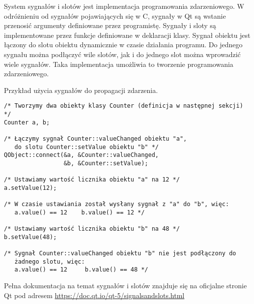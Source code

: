 
\par
System sygnałów i slotów jest implementacja programowania zdarzeniowego.
W odróżnieniu od sygnałów pojawiających się w C, sygnały w Qt są wstanie przenosić argumenty definiowane przez programistę.
Sygnały i sloty są implementowane przez funkcje definiowane w deklaracji klasy.
Sygnał obiektu jest łączony do slotu obiektu dynamicznie w czasie działania programu.
Do jednego sygnału można podłączyć wile slotów, jak i do jednego slot można wprowadzić wiele sygnałów.
Taka implementacja umożliwia to tworzenie programowania zdarzeniowego.

\par
Przykład użycia sygnałów do propagacji zdarzenia.

\begin{lstlisting}
/* Tworzymy dwa obiekty klasy Counter (definicja w następnej sekcji) */
Counter a, b;

/* Łączymy sygnał Counter::valueChanged obiektu "a",
   do slotu Counter::setValue obiektu "b" */
QObject::connect(&a, &Counter::valueChanged,
                 &b, &Counter::setValue);

/* Ustawiamy wartość licznika obiektu "a" na 12 */
a.setValue(12);

/* W czasie ustawiania został wysłany sygnał z "a" do "b", więc:
   a.value() == 12    b.value() == 12 */

/* Ustawiamy wartość licznika obiektu "b" na 48 */
b.setValue(48);

/* Sygnał Counter::valueChanged obiektu "b" nie jest podłączony do
   żadnego slotu, więc:
   a.value() == 12     b.value() == 48 */

\end{lstlisting}

\par
Pełna dokumentacja na temat sygnałów i slotów znajduje się na oficjalne stronie Qt pod adresem \url{https://doc.qt.io/qt-5/signalsandslots.html}